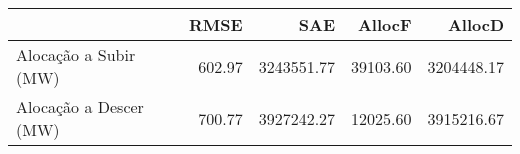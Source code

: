 \begin{tabular}{lrrrr}
\toprule
 & RMSE & SAE & AllocF & AllocD \\
\midrule
Alocação a Subir (MW) & 602.97 & 3243551.77 & 39103.60 & 3204448.17 \\
Alocação a Descer (MW) & 700.77 & 3927242.27 & 12025.60 & 3915216.67 \\
\bottomrule
\end{tabular}
